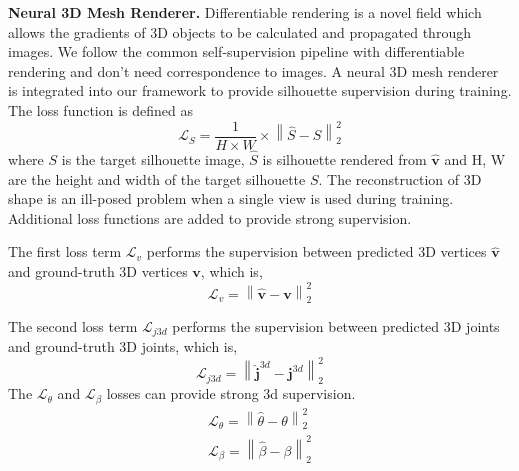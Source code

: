 \documentclass[journal]{IEEEtran}
\begin{document}
\noindent\textbf{Neural 3D Mesh Renderer.} Differentiable rendering is a novel field which allows the gradients of 3D objects to be calculated and propagated through images. We follow the common self-supervision pipeline with differentiable rendering and don't need correspondence to images. A neural 3D mesh renderer  \cite{kato2018neural} is integrated into our framework to provide silhouette supervision during training. The loss function is defined as 
\begin{equation}\label{eq_L_sil}
    \mathcal{L} _{S} = \frac{1}{H\times {W}}\times \left \| \hat{S} - S  \right \|  _{2}^{2}
\end{equation}
where $S$ is the target silhouette image, $\hat{S}$ is silhouette rendered from $\hat{\bm{v}}$ and H, W are the height and width of the target silhouette $S$. The reconstruction of 3D shape is an ill-posed problem when a single view is used during training. Additional loss functions are added to provide strong supervision.


The first loss term $\mathcal{L}_v$ performs the supervision between predicted 3D vertices $\hat{\bm{v}}$ and ground-truth 3D vertices $\bm{v}$, which is,
\begin{equation}
    \mathcal{L}_v = \left \| \hat{\bm{v}} -\bm{v}   \right \| _{2}^{2}
\end{equation}

The second loss term $\mathcal{L}_{j3d}$ performs the supervision between predicted 3D joints and ground-truth 3D joints, which is,
\begin{equation}
    \mathcal{L}_{j3d} = \left \| \hat{\bm{j}}^{3d} - \bm{j}^{3d}  \right \|  _{2}^{2}
\end{equation}
The $\mathcal{L}_{\theta}$ and $\mathcal{L}_{\beta}$ losses can provide strong 3d supervision.
\begin{gather}
    \mathcal{L}_{\theta} = \left \| \hat{\theta} - \theta  \right \|  _{2}^{2} \\
    \mathcal{L}_{\beta} = \left \| \hat{\beta} - \beta  \right \|  _{2}^{2}
\end{gather}
\end{document}
